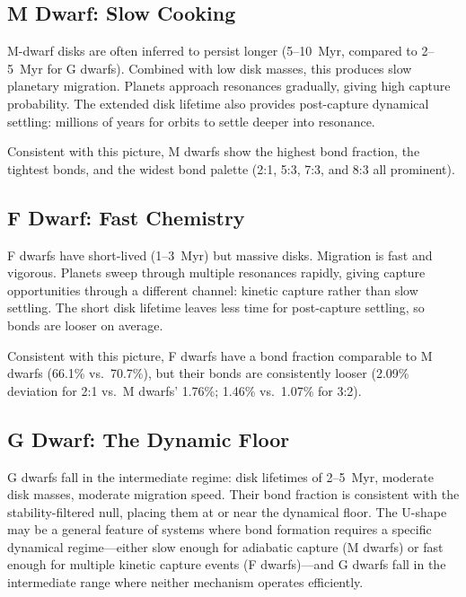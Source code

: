 \documentclass[twocolumn,usenatbib]{mnras}
\begin{document}
\subsection{M Dwarf: Slow Cooking}

M-dwarf disks are often inferred to persist longer (5--10~Myr, compared to
2--5~Myr for G dwarfs)\citep{yasui2010,haisch2001}. Combined with low disk
masses, this produces slow planetary migration. Planets approach resonances
gradually, giving high capture probability. The extended disk lifetime also
provides post-capture dynamical settling: millions of years for orbits to
settle deeper into resonance.

Consistent with this picture, M dwarfs show the highest bond fraction, the
tightest bonds, and the widest bond palette (2:1, 5:3, 7:3, and 8:3 all
prominent).

\subsection{F Dwarf: Fast Chemistry}

F dwarfs have short-lived (1--3~Myr) but massive
disks\citep{sicilia_aguilar}. Migration is fast and vigorous. Planets sweep
through multiple resonances rapidly, giving capture opportunities through a
different channel: kinetic capture rather than slow settling. The short disk
lifetime leaves less time for post-capture settling, so bonds are looser on
average.

Consistent with this picture, F dwarfs have a bond fraction comparable to M
dwarfs (66.1\% vs.\ 70.7\%), but their bonds are consistently looser (2.09\%
deviation for 2:1 vs.\ M dwarfs' 1.76\%; 1.46\% vs.\ 1.07\% for 3:2).

\subsection{G Dwarf: The Dynamic Floor}

G dwarfs fall in the intermediate regime: disk lifetimes of 2--5~Myr, moderate
disk masses, moderate migration speed. Their bond fraction is consistent with
the stability-filtered null, placing them at or near the dynamical floor. The
U-shape may be a general feature of systems where bond formation requires a
specific dynamical regime---either slow enough for adiabatic capture (M dwarfs)
or fast enough for multiple kinetic capture events (F dwarfs)---and G dwarfs
fall in the intermediate range where neither mechanism operates efficiently.
\end{document}

